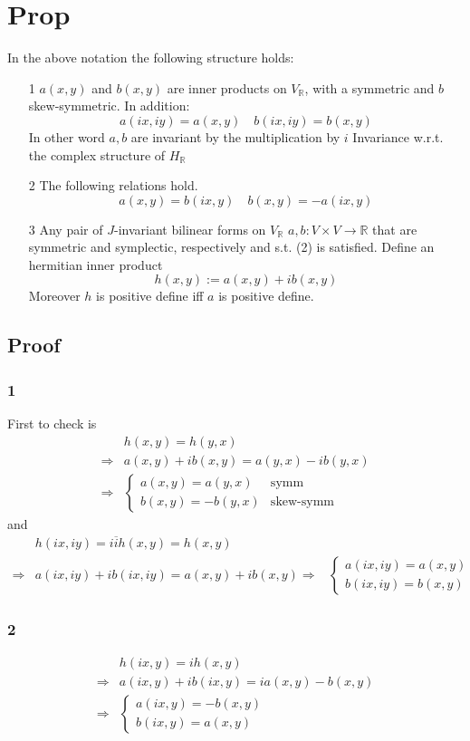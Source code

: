 \documentclass{book}
\begin{document}
\section{Prop}
In the above notation the following structure holds:
\begin{itemize}
    \item [1] $a(x,y)$ and $b(x,y)$ are inner products on $V_\mathbb{R}$, with a symmetric and $b$ skew-symmetric. In addition:$$a(ix,iy)=a(x,y)\quad b(ix,iy)=b(x,y)$$In other word $a,b$ are invariant by the multiplication by $i$ Invariance w.r.t. the complex structure of $H_\mathbb{R}$
    \item [2]The following relations hold. $$a(x,y)=b(ix,y)\quad b(x,y)=-a(ix,y)$$
    \item [3]Any pair of $J$-invariant bilinear forms on $V_\mathbb{R}$ $a,b:V\times V\rightarrow \mathbb{R}$ that are symmetric and symplectic, respectively and s.t. (2) is satisfied. Define an hermitian inner product$$h(x,y):=a(x,y)+ib(x,y)$$ Moreover $h$ is positive define iff $a$ is positive define.
\end{itemize}
\subsection*{Proof}
\subsubsection{1}
First to check is$$\begin{aligned}
    &h(x,y)=h(y,x)\\
    \Rightarrow&a(x,y)+ib(x,y)=a(y,x)-ib(y,x)\\
    \Rightarrow&\begin{cases}
        a(x,y)=a(y,x)&\text{symm}\\b(x,y)=-b(y,x)&\text{skew-symm}
    \end{cases}
\end{aligned}$$
and $$\begin{aligned}
    &h(ix,iy)=i\overline i h(x,y)=h(x,y)\\
    \Rightarrow&a(ix,iy)+ib(ix,iy)=a(x,y)+ib(x,y)
    \Rightarrow&\begin{cases}
        a(ix,iy)=a(x,y)\\b(ix,iy)=b(x,y)
    \end{cases}\end{aligned}$$
\subsubsection{2}
$$\begin{aligned}
    &h(ix,y)=ih(x,y)\\
    \Rightarrow &a(ix,y)+ib(ix,y)=ia(x,y)-b(x,y)\\
    \Rightarrow&\begin{cases}
        a(ix,y)=-b(x,y)\\b(ix,y)=a(x,y)
    \end{cases}\end{aligned}$$
\end{document}
